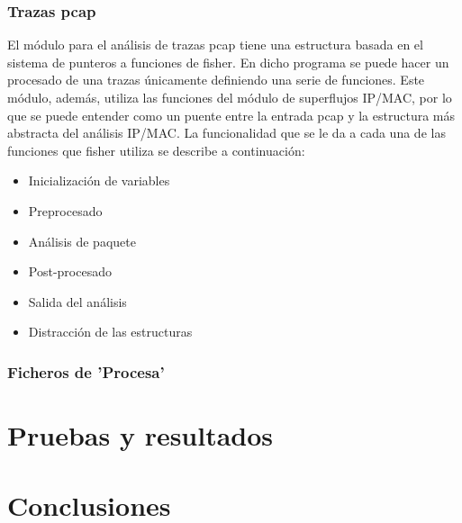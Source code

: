 \documentclass[twoside, 12pt]{epstfg}
\begin{document}
\subsection{Trazas pcap}
El módulo para el análisis de trazas pcap tiene una estructura basada en el sistema de punteros a funciones de fisher. En dicho programa se puede hacer un procesado de una trazas únicamente definiendo una serie de funciones. Este módulo, además, utiliza las funciones del módulo de superflujos IP/MAC, por lo que se puede entender como un puente entre la entrada pcap y la estructura más abstracta del análisis IP/MAC. La funcionalidad que se le da a cada una de las funciones que fisher utiliza se describe a continuación:
\begin{itemize}
	\item{Inicialización de variables}
	\item{Preprocesado}
	\item{Análisis de paquete}
	\item{Post-procesado}
	\item{Salida del análisis}
	\item{Distracción de las estructuras}
\end{itemize}

\subsection{Ficheros de 'Procesa'}

\chapter{Pruebas y resultados}

\chapter{Conclusiones}
\label{chap:Conclusiones}

\backmatter
\appendix

\cleardoublepage

\nocite{*}
{}

\cleardoublepage
\printindex
\end{document}
